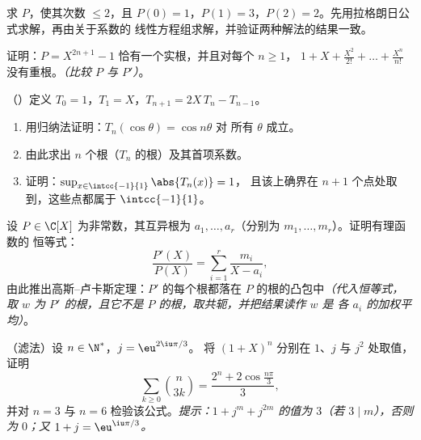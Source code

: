 \begin{exercise}[$\star\star$]\label{exo:b1:poly:8}
求 $P$，使其次数 $\leq 2$，且 $P(0) = 1$，$P(1) =
3$，$P(2) = 2$。先用拉格朗日公式求解，再由关于系数的
线性方程组求解，并验证两种解法的结果一致。
\end{exercise}

\begin{exercise}[$\star\star$]\label{exo:b1:poly:9}
证明：$P = X^{2n+1} - 1$ 恰有一个实根，并且对每个 $n \geq 1$，
 $1 + X + \frac{X^2}{2!} + \dots +
\frac{X^n}{n!}$ 没有重根。\emph{（比较 $P$ 与
$P'$）}。
\end{exercise}

\begin{exercise}[$\star\star\star$]\label{exo:b1:poly:10}
（）定义 $T_0 = 1$，$T_1 = X$，$T_{n+1} =
2X\,T_n - T_{n-1}$。
\begin{enumerate}
  \item 用归纳法证明：$T_n(\cos\theta) = \cos n\theta$ 对
        所有 $\theta$ 成立。
  \item 由此求出 $n$ 个根（$T_n$ 的根）及其首项系数。
  \item 证明：$\sup_{x \in \intcc{-1}{1}} \abs{T_n(x)} = 1$，
        且该上确界在 $n + 1$ 个点处取到，这些点都属于 $\intcc{-1}{1}$。
\end{enumerate}
\end{exercise}

\begin{exercise}[$\star\star\star$]\label{exo:b1:poly:11}
设 $P \in \C[X]$ 为非常数，其互异根为 $a_1, \dots,
a_r$（分别为 $m_1, \dots, m_r$）。证明有理函数的
恒等式：
\[
\frac{P'(X)}{P(X)} = \sum_{i=1}^{r} \frac{m_i}{X - a_i},
\]
由此推出高斯--卢卡斯定理：$P'$ 的每个根都落在
$P$ 的根的凸包中\emph{（代入恒等式，取 $w$ 为 $P'$ 的根，且它不是
$P$ 的根，取共轭，并把结果读作 $w$ 是
各 $a_i$ 的加权平均）}。
\end{exercise}

\begin{exercise}[$\star\star$]\label{exo:b1:poly:12}
（滤法）设 $n \in \N^*$，$j = \eu^{2\iu\pi/3}$。
将 $(1 + X)^n$ 分别在 $1$、$j$ 与 $j^2$ 处取值，证明
\[
\sum_{k \geq 0} \binom{n}{3k}
= \frac{2^n + 2\cos\frac{n\pi}{3}}{3} ,
\]
并对 $n = 3$ 与 $n = 6$ 检验该公式。\emph{提示：$1 +
j^m + j^{2m}$ 的值为 $3$（若 $3 \mid m$），否则为 $0$；又 $1 +
j = \eu^{\iu\pi/3}$。}
\end{exercise}

